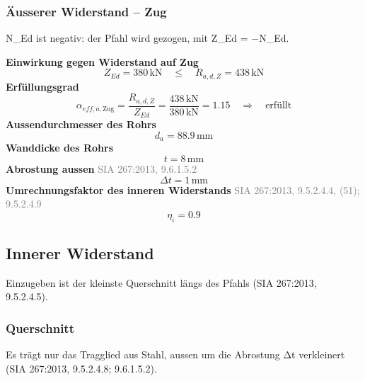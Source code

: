 \documentclass[11pt,a4paper]{article}
\newcommand{\normref}[1]{{\small\textcolor{gray}{#1}}}
\begin{document}
\subsubsection{Äusserer Widerstand – Zug}
N\_Ed ist negativ: der Pfahl wird gezogen, mit Z\_Ed = −N\_Ed.

\noindent\textbf{Einwirkung gegen Widerstand auf Zug}
\begin{equation*}
Z_{Ed} = 380\,\mathrm{kN} \quad \le \quad R_{a,d,Z} = 438\,\mathrm{kN}
\end{equation*}
\noindent\textbf{Erfüllungsgrad}
\begin{equation*}
\alpha_{eff,a,\text{Zug}} = \frac{R_{a,d,Z}}{Z_{Ed}} = \frac{438\,\mathrm{kN}}{380\,\mathrm{kN}} = 1.15 \quad \Rightarrow \quad \text{erfüllt}
\end{equation*}
\noindent\textbf{Aussendurchmesser des Rohrs}
\begin{equation*}
d_a = 88.9\,\mathrm{mm}
\end{equation*}
\noindent\textbf{Wanddicke des Rohrs}
\begin{equation*}
t = 8\,\mathrm{mm}
\end{equation*}
\noindent\textbf{Abrostung aussen} \hfill \normref{SIA 267:2013, 9.6.1.5.2}
\begin{equation*}
\Delta t = 1\,\mathrm{mm}
\end{equation*}
\noindent\textbf{Umrechnungsfaktor des inneren Widerstands} \hfill \normref{SIA 267:2013, 9.5.2.4.4, (51); 9.5.2.4.9}
\begin{equation*}
\eta_i = 0.9
\end{equation*}
\subsection{Innerer Widerstand}
Einzugeben ist der kleinste Querschnitt längs des Pfahls (SIA 267:2013, 9.5.2.4.5).

\subsubsection{Querschnitt}
Es trägt nur das Tragglied aus Stahl, aussen um die Abrostung Δt verkleinert (SIA 267:2013, 9.5.2.4.8; 9.6.1.5.2).
\end{document}
